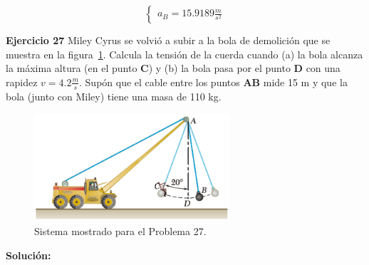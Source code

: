 \documentclass[a4paper,11pt]{scrartcl}
\begin{document}
\begin{center}
\begin{equation}
  \left\lbrace
  \begin{array}{l}
    a_B = 15.9189 \frac{m}{s^2}
  \end{array}
  \right.
\end{equation}

\end{center}

\textbf{Ejercicio 27} Miley Cyrus se volvió a subir a la bola de demolición que se muestra en la figura~\ref{fig:27_1}. Calcula la tensión de la cuerda cuando (a) la bola alcanza la máxima altura (en el punto \textbf{C}) y (b) la bola pasa por el punto \textbf{D} con una rapidez $ v = 4.2 \frac{m}{s}$. Supón que el cable entre los puntos \textbf{AB} mide 15
m y que la bola (junto con Miley) tiene una masa de 110 kg. \\

\begin{figure}[H]
  \centering
  \includegraphics[height=4cm]{27_1}
  \caption{Sistema mostrado para el Problema 27.}
  \label{fig:27_1}
\end{figure}

\textbf{Solución:}
\end{document}
